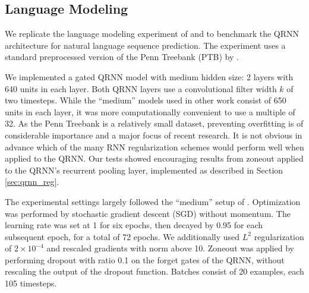\documentclass{article} %
\begin{document}
\subsection{Language Modeling}

We replicate the language modeling experiment of \citet{Zaremba2014} and \citet{Gal2015} to benchmark the QRNN architecture for natural language sequence prediction.
The experiment uses a standard preprocessed version of the Penn Treebank (PTB) by \citet{Mikolov2010}.

We implemented a gated QRNN model with medium hidden size: 2 layers with 640 units in each layer. Both QRNN layers use a convolutional filter width $k$ of two timesteps.
While the ``medium'' models used in other work \citep{Zaremba2014,Gal2015} consist of 650 units in each layer, it was more computationally convenient to use a multiple of 32.
As the Penn Treebank is a relatively small dataset, preventing overfitting is of considerable importance and a major focus of recent research.
It is not obvious in advance which of the many RNN regularization schemes would perform well when applied to the QRNN.
Our tests showed encouraging results from zoneout applied to the QRNN's recurrent pooling layer, implemented as described in Section \ref{sec:qrnn_reg}.

The experimental settings largely followed the ``medium'' setup of \citet{Zaremba2014}.
Optimization was performed by stochastic gradient descent (SGD) without momentum. The learning rate was set at 1 for six epochs, then decayed by 0.95 for each subsequent epoch, for a total of 72 epochs.
We additionally used $L^2$ regularization of $2\times 10^{-4}$ and rescaled gradients with norm above 10.
Zoneout was applied by performing dropout with ratio 0.1 on the forget gates of the QRNN, without rescaling the output of the dropout function.
Batches consist of 20 examples, each 105 timesteps.
\end{document}
